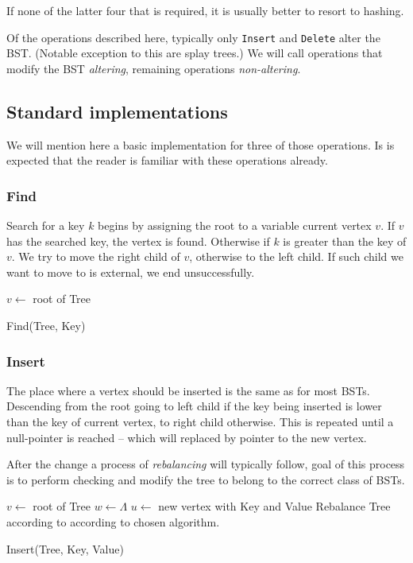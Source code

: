 If none of the latter four that is required, it is usually better to resort to hashing.

Of the operations described here, typically only \texttt{Insert} and \texttt{Delete} alter the BST. (Notable exception to this are splay trees.) We will call operations that modify the BST {\em altering}, remaining operations {\em non-altering}.

\subsection{Standard implementations}

We will mention here a basic implementation for three of those operations. Is is expected that the reader is familiar with these operations already.

\subsubsection*{Find}
Search for a key $k$ begins by assigning the root to a variable current vertex $v$. If $v$ has the searched key, the vertex is found. Otherwise if $k$ is greater than the key of $v$. We try to move the right child of $v$, otherwise to the left child. If such child we want to move to is external, we end unsuccessfully. 

\begin{algorithm}
	\small
	\SetAlgoLined
	$v \gets $ root of Tree\;
	\caption{Find(Tree, Key)}
\end{algorithm}


\subsubsection*{Insert}
The place where a vertex should be inserted is the same as for most BSTs. Descending from the root going to left child if the key being inserted is lower than the key of current vertex, to right child otherwise. This is repeated until a null-pointer is reached -- which will replaced by pointer to the new vertex. 

After the change a process of \textit{rebalancing} will typically follow, goal of this process is to perform checking and modify the tree to belong to the correct class of BSTs.

\begin{algorithm}
	\small
	\SetAlgoLined
	$v \gets $ root of Tree\;
	$w \gets \Lambda$\;
	$u \gets $ new vertex with Key and Value\;
	Rebalance Tree according to according to chosen algorithm.
	\caption{Insert(Tree, Key, Value)}
\end{algorithm}

